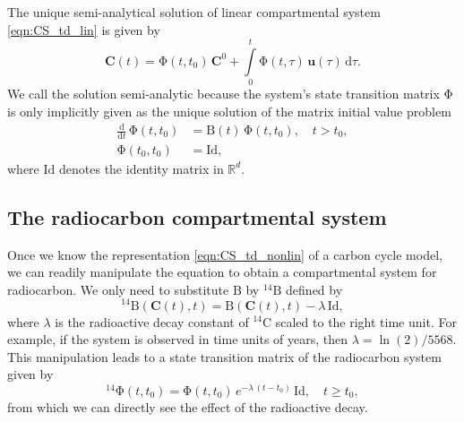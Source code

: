 \documentclass[11pt,a4paper]{article}
\renewcommand{\vec}[1]{\mathbf{#1}}
\newcommand{\tens}[1]{\mathrm{#1}}
\newcommand{\id}{\tens{Id}}
\newcommand{\deriv}[1]{\frac{\mathrm{d}}{\mathrm{d}#1}}
\newcommand{\dd}[1]{\,\mathrm{d}#1}
\newcommand{\intl}{\int\limits}
\newcommand{\R}{\mathbb{R}}
\begin{document}
    The unique semi-analytical solution of linear compartmental system \eqref{eqn:CS_td_lin} is given by \citep{Brockett2015}
    \begin{equation*}
        \vec{C}(t) = \tens{\Phi}(t,t_0)\,\vec{C}^0 + \intl_0^t \tens{\Phi}(t,\tau)\,\vec{u}(\tau)\dd{\tau}.
    \end{equation*}
    We call the solution semi-analytic because the system's state transition matrix $\tens{\Phi}$ is only implicitly given as the unique solution of the matrix initial value problem
    \begin{equation*}
        \begin{aligned}
            \deriv{t}\,\tens{\Phi}(t,t_0) &= \tens{B}(t)\,\tens{\Phi}(t,t_0),\quad t>t_0,\\
            \tens{\Phi}(t_0,t_0) &= \id,
        \end{aligned}
    \end{equation*}
    where $\id$ denotes the identity matrix in $\R^d$. 

\subsection{The radiocarbon compartmental system}
    Once we know the representation \eqref{eqn:CS_td_nonlin} of a carbon cycle model, we can readily manipulate the equation to obtain a compartmental system for radiocarbon.
    We only need to substitute $\tens{B}$ by ${}^{14}\tens{B}$ defined by
    \begin{equation*}
        {}^{14}\tens{B}(\vec{C}(t),t) = \tens{B}(\vec{C}(t),t) - \lambda\,\id,
    \end{equation*}
    where $\lambda$ is the radioactive decay constant of ${}^{14}$C scaled to the right time unit.
    For example, if the system is observed in time units of years, then $\lambda=\ln(2)/5568$.
    This manipulation leads to a state transition matrix of the radiocarbon system given by
    \begin{equation*}
        {}^{14}\tens{\Phi}(t,t_0) = \tens{\Phi}(t,t_0)\, e^{-\lambda\,(t-t_0)}\,\id, \quad t\geq t_0,
    \end{equation*}
    from which we can directly see the effect of the radioactive decay.


\end{document}

